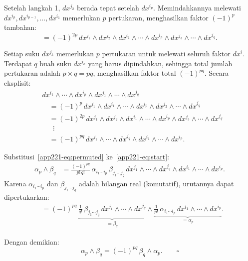 Setelah langkah 1, $dx^{j_2}$ berada tepat setelah $dx^{i_p}$. Memindahkannya melewati $dx^{i_p}, dx^{i_{p-1}}, \ldots, dx^{i_1}$ memerlukan $p$ pertukaran, menghasilkan faktor $(-1)^p$ tambahan:
\begin{equation}
    = (-1)^{2p}\,dx^{j_1} \wedge dx^{j_2} \wedge dx^{i_1} \wedge \cdots \wedge dx^{i_p} \wedge dx^{j_3} \wedge \cdots \wedge dx^{j_q}.
\end{equation}
 
Setiap suku $dx^{j_k}$ memerlukan $p$ pertukaran untuk melewati seluruh faktor $dx^{i}$. Terdapat $q$ buah suku $dx^{j_k}$ yang harus dipindahkan, sehingga total jumlah pertukaran adalah $p \times q = pq$, menghasilkan faktor total $(-1)^{pq}$. Secara eksplisit:
\begin{align}
    &dx^{i_1} \wedge \cdots \wedge dx^{i_p} \wedge dx^{j_1} \wedge \cdots \wedge dx^{j_q} \nonumber\\[4pt]
    &\quad = (-1)^p\,dx^{j_1} \wedge dx^{i_1} \wedge \cdots \wedge dx^{i_p} \wedge dx^{j_2} \wedge \cdots \wedge dx^{j_q} \nonumber\\[4pt]
    &\quad = (-1)^{2p}\,dx^{j_1} \wedge dx^{j_2} \wedge dx^{i_1} \wedge \cdots \wedge dx^{i_p} \wedge dx^{j_3} \wedge \cdots \wedge dx^{j_q} \nonumber\\[4pt]
    &\quad\;\;\vdots \nonumber\\[4pt]
    &\quad = (-1)^{pq}\,dx^{j_1} \wedge \cdots \wedge dx^{j_q} \wedge dx^{i_1} \wedge \cdots \wedge dx^{i_p}. \label{app221-eq:permuted}
\end{align}
 
Substitusi~\eqref{app221-eq:permuted} ke~\eqref{app221-eq:start}:
\begin{align}
    \alpha_p \wedge \beta_q
    &= \frac{(-1)^{pq}}{p!\,q!}\,\alpha_{i_1 \cdots i_p}\,\beta_{j_1 \cdots j_q}\,
    dx^{j_1} \wedge \cdots \wedge dx^{j_q} \wedge dx^{i_1} \wedge \cdots \wedge dx^{i_p}.
\end{align}
Karena $\alpha_{i_1 \cdots i_p}$ dan $\beta_{j_1 \cdots j_q}$ adalah bilangan real (komutatif), urutannya dapat dipertukarkan:
\begin{align}
    &= (-1)^{pq}\,\underbrace{\frac{1}{q!}\,\beta_{j_1 \cdots j_q}\,dx^{j_1} \wedge \cdots \wedge dx^{j_q}}_{\displaystyle = \beta_q} \wedge \underbrace{\frac{1}{p!}\,\alpha_{i_1 \cdots i_p}\,dx^{i_1} \wedge \cdots \wedge dx^{i_p}}_{\displaystyle = \alpha_p}.
\end{align}
 
Dengan demikian:
\begin{equation}
    \alpha_p \wedge \beta_q = (-1)^{pq}\,\beta_q \wedge \alpha_p. \qquad\square
\end{equation}

